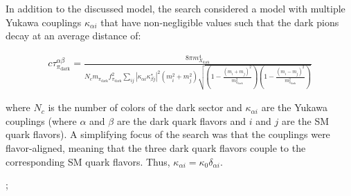 In addition to the discussed model, the search considered a model with multiple Yukawa couplings $\kappa_{\alpha i}$ that have non-negligible values such that the dark pions decay at an average distance of:

\begin{equation}
	\begin{aligned}
		c\tau_{\pi_{\text{dark}}}^{\alpha\beta} = \frac{
		8\pi m_{X_{\text{dark}}}^4
		}{
		N_c m_{\pi_{\text{dark}}}f^2_{\pi_{\text{dark}}} \sum_{ij}|\kappa_{\alpha i}\kappa_{\beta j}^{*}|^2 (m_i^2 + m_j^2) \sqrt{\left(1 - \frac{(m_i + m_j)^2}{m_{\pi_{\text{dark}}}^2}\right)\left(1-\frac{(m_i - m_j)^2}{m_{\pi_{\text{dark}}}^2}\right)}
		}
	\end{aligned}
\end{equation}

where $N_c$ is the number of colors of the dark sector and $\kappa_{\alpha i}$ are the Yukawa couplings (where $\alpha$ and $\beta$ are the dark quark flavors and $i$ and $j$ are the SM quark flavors). A simplifying focus of the search was that the couplings were flavor-aligned, meaning that the three dark quark flavors couple to the corresponding SM quark flavors. Thus, $\kappa_{\alpha i} = \kappa_{0}\delta_{\alpha i}$.

;